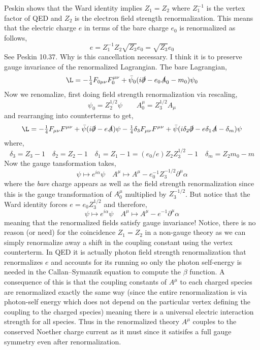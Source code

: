 \documentclass[12pt]{article}
\begin{document}
Peskin shows that the Ward identity implies $Z_1 = Z_2$ where $Z_1^{-1}$ is the vertex factor of QED and $Z_2$ is the electron field strength renormalization. This means that the electric charge $e$ in terms of the bare charge $e_0$ is renormalized as follows,
\[ e = Z_1^{-1} Z_2 \sqrt{Z_3} e_0 = \sqrt{Z_3} e_0 \]
See Peskin 10.37. Why is this cancellation necessary. I think it is to preserve gauge invariance of the renormalized Lagrangian. The bare Lagrangian,
\[ \L = -\tfrac{1}{4} F_{0 \mu \nu} F_0^{\mu \nu} + \bar{\psi}_0(i \slashed{\partial} - e_0 \slashed{A}_{0} - m_0) \psi_0 \]
Now we renomalize, first doing field strength renormalization via rescaling,
\[ \psi_0 = Z_2^{1/2} \psi \quad \quad A_0^\mu = Z_3^{1/2} A_\mu \]
and rearranging into counterterms to get,
\[ \L = - \tfrac{1}{4} F_{\mu \nu} F^{\mu \nu} + \bar{\psi}( i \slashed{\partial} - e \slashed{A})\psi  - \tfrac{1}{4} \delta_3 F_{\mu \nu} F^{\mu \nu} + \bar{\psi}( i \delta_2 \slashed{\partial} - e \delta_1 \slashed{A} - \delta_m)\psi
\]
where,
\[ \delta_3 = Z_3 - 1 \quad \delta_2 = Z_2 - 1 \quad \delta_1 = Z_1 - 1 = (e_0/e) Z_2 Z_3^{1/2} - 1 \quad \delta_m = Z_2 m_0 - m \]
Now the gauge tansformation takes,
\[ \psi \mapsto e^{i \alpha} \psi \quad A^\mu \mapsto A^\mu - e_0^{-1} Z_3^{-1/2} \partial^\mu \alpha \]
where the \textit{bare} charge appears as well as the field strength renormalization since this is the gauge transformation of $A_0^{\mu}$ multiplied by $Z_{3}^{-1/2}$. But notice that the Ward identity forces $e = e_0 Z_3^{1/2}$ and therefore,
\[ \psi \mapsto e^{i \alpha} \psi \quad A^\mu \mapsto A^\mu - e^{-1} \partial^\mu \alpha \]
meaning that the renormalized fields satisfy gauge invariance! Notice, there is no reason (or need) for the coincidence $Z_1 = Z_2$ in a non-gauge theory as we can simply renormalize away a shift in the coupling constant using the vertex counterterm. In QED it is actually photon field strength renormalization that renormalizes $e$ and accounts for its running so only the photon self-energy is needed in the Callan–Symanzik equation to compute the $\beta$ function. A consequence of this is that the coupling constants of $A^\mu$ to each charged species are renormalized exactly the same way (since the entire renormalization is via photon-self energy which does not depend on the particular vertex defining the coupling to the charged species) meaning there is a universal electric interaction strength for all species. Thus in the renormalized theory $A^\mu$ couples to the conserved Noether charge current as it must since it satisifes a full gauge symmetry even after renormalization. 
\end{document}

